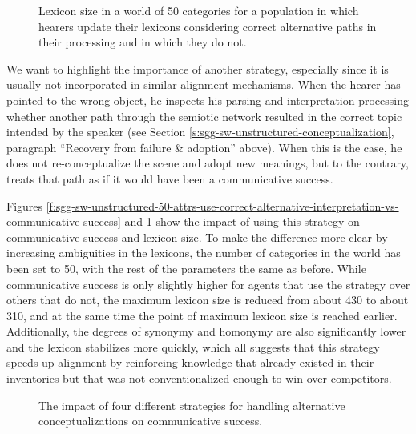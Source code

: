 \begin{figure}[t]
  \caption{Lexicon size in a world of 50 categories for a population
    in which hearers update their lexicons considering correct
    alternative paths in their processing and in which they do not.}
  \label{f:sgg-sw-unstructured-50-attrs-use-correct-alternative-interpretation-vs-lexicon-size}
\end{figure}

\stopfiguregroup

We want to highlight the importance of another strategy, especially
since it is usually not incorporated in similar alignment
mechanisms. When the hearer has pointed to the wrong object, he
inspects his parsing and interpretation processing whether another
path through the semiotic network resulted in the correct topic
intended by the speaker (see Section
\ref{s:sgg-sw-unstructured-conceptualization}, paragraph ``Recovery
from failure \& adoption'' above). When this is the case, he does not
re-conceptualize the scene and adopt new meanings, but to the
contrary, treats that path as if it would have been a communicative
success.

Figures
\ref{f:sgg-sw-unstructured-50-attrs-use-correct-alternative-interpretation-vs-communicative-success}
and
\ref{f:sgg-sw-unstructured-50-attrs-use-correct-alternative-interpretation-vs-lexicon-size}
show the impact of using this strategy on communicative success and
lexicon size. To make the difference more clear by increasing
ambiguities in the lexicons, the number of categories in the world has
been set to 50, with the rest of the parameters the same as
before. While communicative success is only slightly higher for agents
that use the strategy over others that do not, the maximum lexicon
size is reduced from about 430 to about 310, and at the same time the
point of maximum lexicon size is reached earlier. Additionally, the
degrees of synonymy and homonymy are also significantly lower and the
lexicon stabilizes more quickly, which all suggests that this strategy
speeds up alignment by reinforcing knowledge that already existed in
their inventories but that was not conventionalized enough to win over
competitors.\\

\startfiguregroup

\begin{figure}[t]
  \caption{The impact of four different strategies for handling
    alternative conceptualizations on communicative success.}
  \label{f:sgg-sw-unstructured-50-attrs-conceptualization-handling-vs-communicative-success}
\end{figure}


